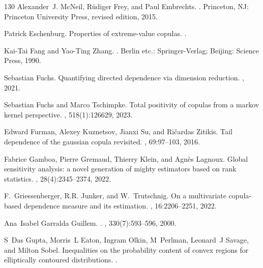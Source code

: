 \documentclass{article}
\begin{document}
\begin{thebibliography}{130}
    Alexander~J. McNeil, R{\"u}diger Frey, and Paul Embrechts.
    .
    \newblock Princeton, NJ: Princeton University Press, revised edition,
      2015.

    Patrick Eschenburg.
    \newblock Properties of extreme-value copulas.
    .

    Kai-Tai Fang and Yao-Ting Zhang.
    .
    \newblock Berlin etc.: Springer-Verlag; Beijing: Science Press, 1990.

    Sebastian Fuchs.
    \newblock Quantifying directed dependence via dimension reduction.
    , 2021.
    
    Sebastian Fuchs and Marco Tschimpke.
    \newblock Total positivity of copulas from a markov kernel perspective.
    ,
      518(1):126629, 2023.
    
    Edward Furman, Alexey Kuznetsov, Jianxi Su, and Ri{\v{c}}ardas Zitikis.
    \newblock Tail dependence of the gaussian copula revisited.
    , 69:97--103, 2016.
    
    Fabrice Gamboa, Pierre Gremaud, Thierry Klein, and Agn{\`e}s Lagnoux.
    \newblock Global sensitivity analysis: a novel generation of mighty estimators
      based on rank statistics.
    , 28(4):2345--2374, 2022.

    F.~Griessenberger, R.R. Junker, and W.~Trutschnig.
    \newblock On a multivariate copula-based dependence measure and its estimation.
    , 16:2206--2251, 2022.

    Ana~Isabel {Garralda Guillem}.
    .
    , 330(7):593--596,
      2000.
    
    S~Das Gupta, Morris~L Eaton, Ingram Olkin, M~Perlman, Leonard~J Savage, and
      Milton Sobel.
    \newblock Inequalities on the probability content of convex regions for
      elliptically contoured distributions.
    .
    

\end{thebibliography}
\end{document}
